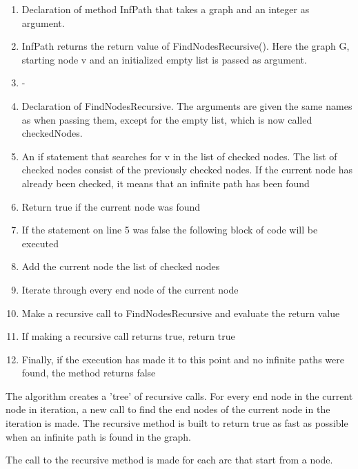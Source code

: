 \documentclass[]{article}
\begin{document}
\begin{enumerate}
	\item Declaration of method InfPath that takes a graph and an integer as argument.
	
	\item InfPath returns the return value of FindNodesRecursive(). Here the graph G, starting node v and an initialized
	empty list is passed as argument.
	
	\item -
	
	\item Declaration of FindNodesRecursive. The arguments are given the same names as when passing them, except for the empty list, which is now called checkedNodes.
	
	\item An if statement that searches for v in the list of checked nodes. The list of checked nodes consist of the
	previously checked nodes. If the current node has already been checked, it means that an infinite path has been found
	
	\item Return true if the current node was found
	
	\item If the statement on line 5 was false the following block of code will be executed
	
	\item Add the current node the list of checked nodes
	
	\item Iterate through every end node of the current node
	
	\item Make a recursive call to FindNodesRecursive and evaluate the return value
	
	\item If making a recursive call returns true, return true
	
	\item Finally, if the execution has made it to this point and no infinite paths were found, the method returns false
\end{enumerate}

The algorithm creates a 'tree' of recursive calls. For every end node in the current node in iteration, a new call to find the end nodes of the current node in the iteration is made. The recursive method is built to return true as fast as possible when an infinite path is found in the graph.

The call to the recursive method is made for each arc that start from a node. 
\end{document}

